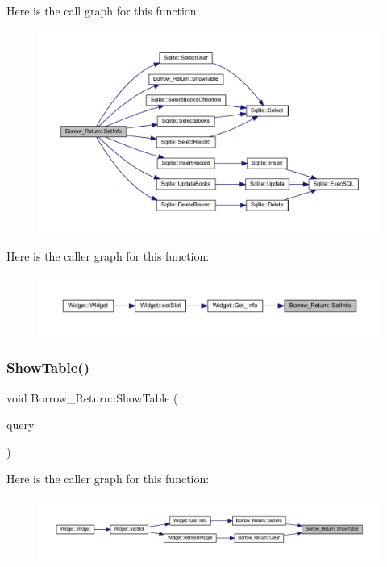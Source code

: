Here is the call graph for this function\+:
\nopagebreak
\begin{figure}[H]
\begin{center}
\leavevmode
\includegraphics[width=350pt]{class_borrow___return_afd3bfd00077c0704c8b26f8e4254e176_cgraph}
\end{center}
\end{figure}
Here is the caller graph for this function\+:
\nopagebreak
\begin{figure}[H]
\begin{center}
\leavevmode
\includegraphics[width=350pt]{class_borrow___return_afd3bfd00077c0704c8b26f8e4254e176_icgraph}
\end{center}
\end{figure}
\mbox{\label{class_borrow___return_a061bb2484dacfe92218acb7d6e9494e5}} 
\subsubsection{\texorpdfstring{ShowTable()}{ShowTable()}}
{\footnotesize\ttfamily void Borrow\+\_\+\+Return\+::\+Show\+Table (\begin{DoxyParamCaption}\item[{Q\+Sql\+Query}]{query }\end{DoxyParamCaption})}

Here is the caller graph for this function\+:
\nopagebreak
\begin{figure}[H]
\begin{center}
\leavevmode
\includegraphics[width=350pt]{class_borrow___return_a061bb2484dacfe92218acb7d6e9494e5_icgraph}
\end{center}
\end{figure}


